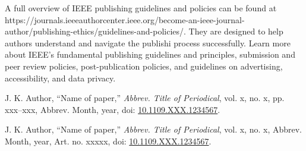 \documentclass{IEEEtaes}
\begin{document}
A full overview of IEEE publishing guidelines and policies can be found
at {{https://journals.ieeeauthorcenter.ieee.org/become-an-ieee-journal-author/publishing-ethics/guidelines-and-policies/}}. They are designed to help authors understand and navigate the publishi process successfully. Learn more about IEEE's fundamental publishing guidelines and principles, submission and peer review policies, post-publication policies, and guidelines on advertising, accessibility, and data privacy.


\vspace*{-12pt}
\def\refname{}
\begin{thebibliography}{[34]}
\item[]  J. K. Author, ``Name of paper,'' \emph{Abbrev. Title of Periodical}, vol. x, no. x, pp. xxx--xxx, Abbrev. Month, year, doi: \href{https://dx.doi.org/10.1109.XXX.1234567}{10.1109.XXX.1234567}.
\end{thebibliography}

\def\refname{}
\begin{thebibliography}{[34]}\vspace*{-12pt}
\item[] J. K. Author, ``Name of paper,'' \emph{Abbrev. Title of Periodical}, vol. x, no. x, Abbrev. Month, year, Art. no. xxxxx, doi: \href{https://dx.doi.org/10.1109.XXX.1234567}{10.1109.XXX.1234567}.
\end{thebibliography}
\end{document}

